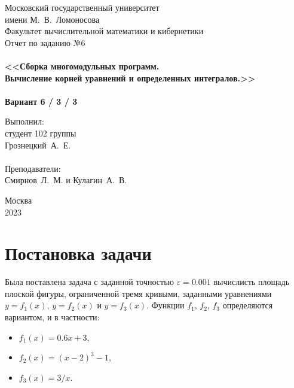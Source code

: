 \documentclass[a4paper,12pt,titlepage,finall]{article}
\begin{document}
\begin{titlepage}
    \begin{center}
	{\small \sc Московский государственный университет \\имени М.~В.~Ломоносова\\
	Факультет вычислительной математики и кибернетики\\}
	\vfill
	{\Large \sc Отчет по заданию №6}\\
	~\\
	{\large \bf <<Сборка многомодульных программ. \\
	Вычисление корней уравнений и определенных интегралов.>>}\\ 
	~\\
	{\large \bf Вариант 6 / 3 / 3}
    \end{center}
    \begin{flushright}
	\vfill {Выполнил:\\
	студент 102 группы\\
	Грознецкий~А.~Е.\\
	~\\
	Преподаватели:\\
	Смирнов~Л.~М. и Кулагин~А.~В.}
    \end{flushright}
    \begin{center}
	\vfill
	{\small Москва\\2023}
    \end{center}
\end{titlepage}

\tableofcontents
\newpage

\section{Постановка задачи}

Была поставлена задача с заданной точностью $\varepsilon=0.001$ вычислисть площадь плоской фигуры, ограниченной тремя кривыми, заданными уравнениями $y=f_1(x)$, $y=f_2(x)$ и $y=f_3(x)$. Функции $f_1$, $f_2$, $f_3$ определяются вариантом, и в частности:
\begin{itemize}
	\item[] $f_1(x)=0.6x+3$,
	\item[] $f_2(x)=(x-2)^3-1$,
	\item[] $f_3(x)=3/x$.
\end{itemize}
\end{document}

